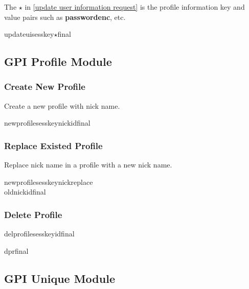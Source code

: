 \documentclass[oneside,titlepage,a4paper]{Definition/retrospy} %
\begin{document}
\ClientRequest
The $\star$ in \ref{update user information request} is the profile information key and value pairs such as \textbf{\tbs passwordenc\tbs}, etc.
\begin{mybox}[label = update user request]
	\tbs updateui\tbs\tbs sesskey\tbs<session key>\tbs $\star$\tbs final\tbs
\end{mybox}



\subsection{GPI Profile Module}

\subsubsection{Create New Profile}
Create a new profile with nick name.
\ClientRequest

\begin{mybox}
	\tbs newprofile\tbs\tbs sesskey\tbs <session key>\tbs nick\tbs <nick name>\tbs id\tbs<operation id>\tbs final\tbs
\end{mybox}
\subsubsection{Replace Existed Profile}
Replace nick name in a profile with a new nick name.
\ClientRequest

\begin{mybox}
\tbs newprofile\tbs\tbs sesskey\tbs nick\tbs replace\\\tbs oldnick\tbs id\tbs final\tbs
\end{mybox}

\subsubsection{Delete Profile}
\ClientRequest

\begin{mybox}
	\tbs delprofile\tbs\tbs sesskey\tbs<session key>\tbs id\tbs<operation id>\tbs final\tbs
\end{mybox}
\ServerResponse

\begin{mybox}
	\tbs dpr\tbs final\tbs
\end{mybox}



\subsection{GPI Unique Module}
\end{document}
